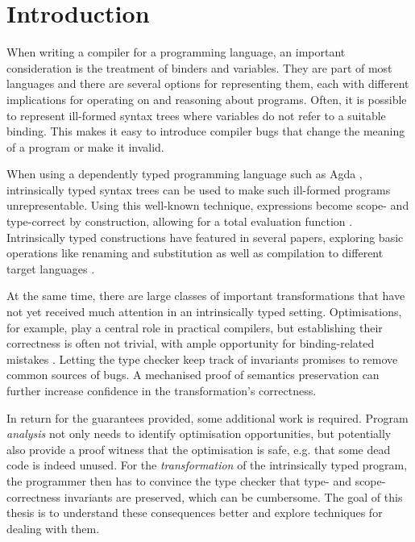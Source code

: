 \chapter{Introduction}
\label{ch:introduction}
    When writing a compiler for a programming language,
    an important consideration is the treatment of binders and variables.
    They are part of most languages and
    there are several options for representing them,
    each with different implications for operating on and reasoning about programs.
    Often, it is possible to represent ill-formed syntax trees
    where variables do not refer to a suitable binding.
    This makes it easy to introduce compiler bugs that change the meaning of a program
    or make it invalid.

    When using a dependently typed programming language such as Agda
    \cite{Norell2008Agda},
    intrinsically typed syntax trees can be used to
    make such ill-formed programs unrepresentable.
    Using this well-known technique,
    expressions become scope- and type-correct by construction,
    allowing for a total evaluation function
    \cite{Augustsson1999WellTypedInterpreter}.
    Intrinsically typed constructions have featured in several papers,
    exploring basic operations like renaming and substitution
    \cite{Allais2018UniverseOfSyntaxes}
    as well as compilation to different target languages
    \cite[online supplementary material]{Pickard2021CalculatingDependentlyTypedCompilers}.

    At the same time, there are large classes of important transformations
    that have not yet received much attention in an intrinsically typed setting.
    Optimisations, for example, play a central role in practical compilers,
    but establishing their correctness is often not trivial,
    with ample opportunity for binding-related mistakes
    \cite{SpectorZabusky2019EmbracingFormalizationGap,Maclaurin2022Foil}.
    Letting the type checker keep track of invariants
    promises to remove common sources of bugs.
    A mechanised proof of semantics preservation can further increase
    confidence in the transformation's correctness.

    In return for the guarantees provided, some additional work is required.
    Program \emph{analysis} not only needs to identify optimisation opportunities,
    but potentially also provide a proof witness that the optimisation is safe,
    e.g. that some dead code is indeed unused.
    For the \emph{transformation} of the intrinsically typed program,
    the programmer then has to convince the type checker
    that type- and scope-correctness invariants are preserved,
    which can be cumbersome.
    The goal of this thesis is to understand these consequences better
    and explore techniques for dealing with them.

